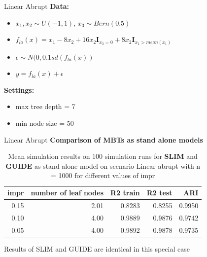 \documentclass[9pt, xcolor=table]{beamer}
\begin{document}
\begin{frame}{Linear Abrupt}
\textbf{Data:}
\begin{itemize}
    \item $x_1, x_2 \sim U(-1,1)$, $x_3 \sim Bern(0.5)$
    \item $ f_{la}(x) = x_{1} - 8  x_2 + 16  x_2  \mathbf{I}_{x_3 = 0} + 8  x_2  \mathbf{I}_{x_1 > mean(x_1)}$
    \item $\epsilon \sim N(0, 0.1 sd(f_{la}(x))$
    \item $y = f_{la}(x) + \epsilon$
\end{itemize} 

\textbf{Settings:}
\begin{itemize}
    \item max tree depth = 7 
    \item min node size = 50    
\end{itemize}
\end{frame}


\begin{frame}{Linear Abrupt}
\textbf{Comparison of MBTs as stand alone models}

\begin{table}
\caption{Mean simulation results on 100 simulation runs for \textbf{SLIM} and \textbf{GUIDE}  as stand alone model on scenario Linear abrupt with n = 1000 for different values of impr }
\centering
\begin{tabular}[t]{r|r|r|r|r}
\hline
impr & number of leaf nodes & R2 train & R2 test & ARI\\
\hline
0.15 & 2.01 & 0.8283 & 0.8255 & 0.9950\\
\hline
0.10 & 4.00 & 0.9889 & 0.9876 & 0.9742\\
\hline
0.05 & 4.00 & 0.9892 & 0.9878 & 0.9735\\
\hline
\end{tabular}
\end{table}    

Results of SLIM and GUIDE are identical in this special case
\end{frame}
\end{document}
